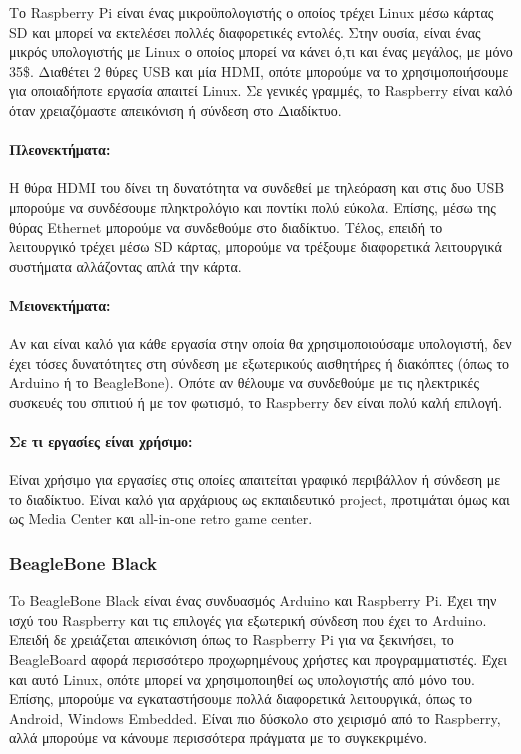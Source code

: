 \documentclass[12pt, a4paper, oneside]{report}
\begin{document}
Το Raspberry Pi είναι ένας μικροϋπολογιστής ο οποίος τρέχει Linux μέσω κάρτας SD και μπορεί να εκτελέσει πολλές διαφορετικές εντολές. Στην ουσία, είναι ένας μικρός υπολογιστής με Linux ο οποίος μπορεί να κάνει ό,τι και ένας μεγάλος, με μόνο 35\$. Διαθέτει 2 θύρες USB και μία HDMI, οπότε μπορούμε να το χρησιμοποιήσουμε για οποιαδήποτε εργασία απαιτεί Linux. Σε γενικές γραμμές, το Raspberry είναι καλό όταν χρειαζόμαστε απεικόνιση ή σύνδεση στο Διαδίκτυο.

\paragraph{Πλεονεκτήματα:} Η θύρα HDMI του δίνει τη δυνατότητα να συνδεθεί με τηλεόραση και στις δυο USB μπορούμε να συνδέσουμε πληκτρολόγιο και ποντίκι πολύ εύκολα. Επίσης, μέσω της θύρας Ethernet μπορούμε να συνδεθούμε στο διαδίκτυο. Τέλος, επειδή το λειτουργικό τρέχει μέσω SD κάρτας, μπορούμε να τρέξουμε διαφορετικά λειτουργικά συστήματα αλλάζοντας απλά την κάρτα.

\paragraph{Μειονεκτήματα:} Αν και είναι καλό για κάθε εργασία στην οποία θα χρησιμοποιούσαμε υπολογιστή, δεν έχει τόσες δυνατότητες στη σύνδεση με εξωτερικούς αισθητήρες ή διακόπτες (όπως το Arduino ή το BeagleBone). Οπότε αν θέλουμε να συνδεθούμε με τις ηλεκτρικές συσκευές του σπιτιού ή με τον φωτισμό, το Raspberry δεν είναι πολύ καλή επιλογή.

\paragraph{Σε τι εργασίες είναι χρήσιμο:} Είναι χρήσιμο για εργασίες στις οποίες απαιτείται γραφικό περιβάλλον ή σύνδεση με το διαδίκτυο. Είναι καλό για αρχάριους ως εκπαιδευτικό project, προτιμάται όμως και ως Media Center και all-in-one retro game center.

\subsubsection{BeagleBone Black}

To BeagleBone Black είναι ένας συνδυασμός Arduino και Raspberry Pi. Έχει την ισχύ του Raspberry και τις επιλογές για εξωτερική σύνδεση που έχει το Arduino. Επειδή δε χρειάζεται απεικόνιση όπως το Raspberry Pi για να ξεκινήσει, το BeagleBoard αφορά περισσότερο προχωρημένους χρήστες και προγραμματιστές. Έχει και αυτό Linux, οπότε μπορεί να χρησιμοποιηθεί ως υπολογιστής από μόνο του. Επίσης, μπορούμε να εγκαταστήσουμε πολλά διαφορετικά λειτουργικά, όπως το Android, Windows Embedded. Είναι πιο δύσκολο στο χειρισμό από το Raspberry, αλλά μπορούμε να κάνουμε περισσότερα πράγματα με το συγκεκριμένο.
\end{document}
